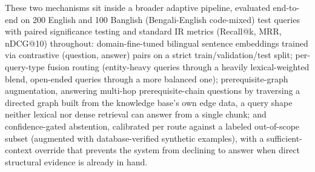 \documentclass[a4paper,twoside]{article}
\begin{document}
{These two mechanisms sit inside a broader adaptive pipeline, evaluated end-to-end on 200 English and 100 Banglish (Bengali-English code-mixed) test queries with paired significance testing and standard IR metrics (Recall@k, MRR, nDCG@10) throughout: domain-fine-tuned bilingual sentence embeddings trained via contrastive (question, answer) pairs on a strict train/validation/test split; per-query-type fusion routing (entity-heavy queries through a heavily lexical-weighted blend, open-ended queries through a more balanced one); prerequisite-graph augmentation, answering multi-hop prerequisite-chain questions by traversing a directed graph built from the knowledge base's own edge data, a query shape neither lexical nor dense retrieval can answer from a single chunk; and confidence-gated abstention, calibrated per route against a labeled out-of-scope subset (augmented with database-verified synthetic examples), with a sufficient-context override that prevents the system from declining to answer when direct structural evidence is already in hand.

}
\end{document}
